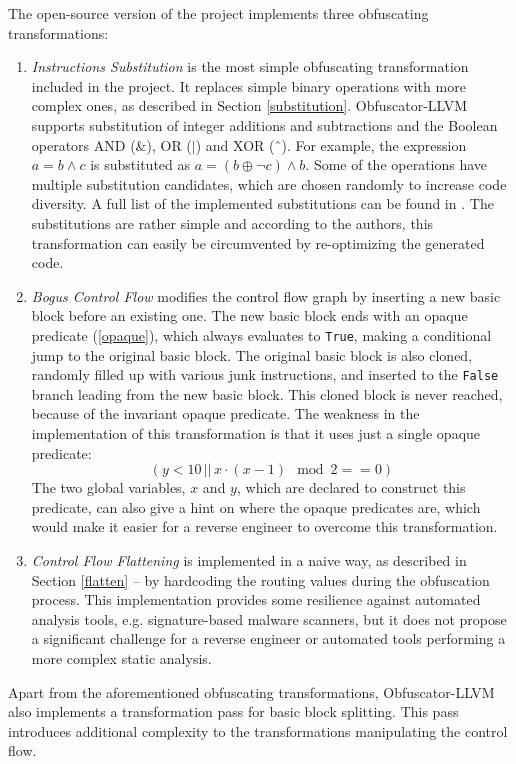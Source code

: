 \documentclass[
  digital, %
  table,   %
  twoside, %
  nolof,     %
  nolot,     %
]{fithesis3}
\theoremstyle{definition}
\begin{document}
The open-source version of the project implements three obfuscating transformations:
\begin{enumerate}
    \item \textit{Instructions Substitution} is the most simple obfuscating transformation included in the project. It replaces simple binary operations with more complex ones, as described in Section \ref{substitution}. Obfuscator-LLVM supports substitution of integer additions and subtractions and the Boolean operators  AND  ($\&$),  OR  ($|$)  and  XOR  (ˆ). For example, the expression $a = b \wedge c$ is substituted as $a = (b \oplus \neg c) \wedge b$. Some of the operations have multiple substitution candidates, which are chosen randomly to increase code diversity. A full list of the implemented substitutions can be found in \cite{obfuscator-llvm}. The substitutions are rather simple and according to the authors, this transformation  can easily  be  circumvented  by  re-optimizing  the  generated  code.
    \item \textit{Bogus Control Flow} modifies the control flow graph by inserting a new basic block before an existing one. The new basic block ends with an opaque predicate (\ref{opaque}), which always evaluates to \texttt{True}, making a conditional jump to the original basic block. The original basic block is also cloned, randomly filled up with various junk instructions, and inserted to the \texttt{False} branch leading from the new basic block. This cloned block is never reached, because of the invariant opaque predicate. The weakness in the implementation of this transformation is that it uses just a single opaque predicate: $$(y < 10\, ||\, x \cdot (x - 1) \mod 2 == 0)$$ The two global variables, $x$ and $y$, which are declared to construct this predicate, can also give a hint on where the opaque predicates are, which would make it easier for a reverse engineer to overcome this transformation. 
    \item \textit{Control Flow Flattening} is implemented in a naive way, as described in Section \ref{flatten} -- by hardcoding the routing values during the obfuscation process. This implementation provides some resilience against automated analysis tools, e.g. signature-based malware scanners, but it does not propose a significant challenge for a reverse engineer or automated tools performing a more complex static analysis.
\end{enumerate}

Apart from the aforementioned obfuscating transformations, Obfuscator-LLVM also implements a transformation pass for basic block splitting. This pass introduces additional complexity to the transformations manipulating the control flow. 
\end{document}
